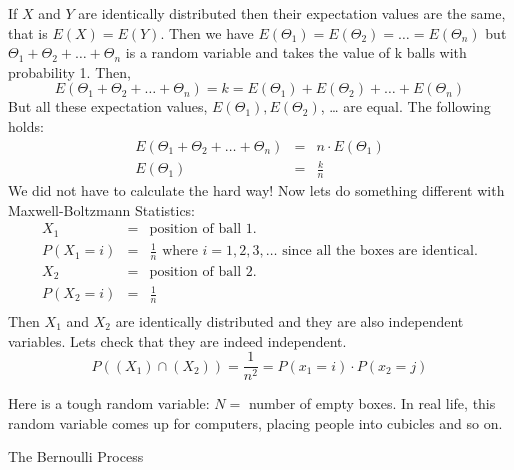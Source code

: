 If $X$ and $Y$ are identically distributed then their expectation values
are the same, that is $E(X)=E(Y)$. Then we have $E(\Theta_{1})=
E(\Theta_{2})= \ldots = E(\Theta_{n})$ but $\Theta_{1}+\Theta_{2}+
\ldots +\Theta_{n}$ is a random variable and takes the value of k balls
with probability 1. Then,
\begin{equation}
E(\Theta_{1}+ \Theta_{2}+ \ldots +\Theta_{n})=k= E(\Theta_{1})+
E(\Theta_{2})+ \ldots +E(\Theta_{n})
\end{equation}
But all these expectation values, $E(\Theta_{1}), E(\Theta_{2})$, \ldots
are equal. The following holds:
\begin{eqnarray*}
E(\Theta_{1}+ \Theta_{2}+ \ldots + \Theta_{n}) &=& n \cdot E(\Theta_{1})\\
E(\Theta_{1}) &=& \frac{k}{n}
\end{eqnarray*}
We did not have to calculate the hard way! Now lets do something
different with Maxwell-Boltzmann Statistics:
\begin{eqnarray*}
X_{1} &=& \mbox{position of ball } 1.\\
P(X_{1}=i) &=& \frac{1}{n} \mbox{ where } i=1,2,3,\ldots \mbox{ since all
the boxes are identical.}\\
X_{2} &=& \mbox{position of ball } 2.\\
P(X_{2}=i) &=& \frac{1}{n}\\
\end{eqnarray*}
Then  $X_{1}$ and $X_{2}$ are identically distributed and they are
also independent variables. Lets check that they are indeed
independent.
\begin{equation}
P((X_{1}) \cap (X_2)) = \frac{1}{n^2} = P(x_1 =i) \cdot P(x_2 =j)
\end{equation}
 
Here is a tough random variable: $N =$ number of empty boxes.
In real life, this random variable comes up for computers, placing
people into cubicles and so on.

 The Bernoulli Process

